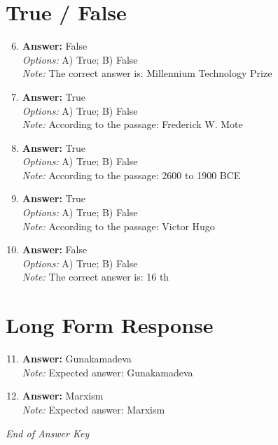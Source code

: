 \documentclass[12pt]{article}
\begin{document}
\section*{True / False}
\begin{enumerate}[label=\arabic*.]
\setcounter{enumi}{5}
\item \textbf{Answer:} False
\\ \textit{Options:} A) True; B) False
\\ \textit{Note:} The correct answer is: Millennium Technology Prize
\item \textbf{Answer:} True
\\ \textit{Options:} A) True; B) False
\\ \textit{Note:} According to the passage: Frederick W. Mote
\item \textbf{Answer:} True
\\ \textit{Options:} A) True; B) False
\\ \textit{Note:} According to the passage: 2600 to 1900 BCE
\item \textbf{Answer:} True
\\ \textit{Options:} A) True; B) False
\\ \textit{Note:} According to the passage: Victor Hugo
\item \textbf{Answer:} False
\\ \textit{Options:} A) True; B) False
\\ \textit{Note:} The correct answer is: 16 th
\end{enumerate}

\section*{Long Form Response}
\begin{enumerate}[label=\arabic*.]
\setcounter{enumi}{10}
\item \textbf{Answer:} Gunakamadeva
\\ \textit{Note:} Expected answer: Gunakamadeva
\item \textbf{Answer:} Marxism
\\ \textit{Note:} Expected answer: Marxism
\end{enumerate}

\vfill
\noindent\textit{End of Answer Key}
\end{document}
